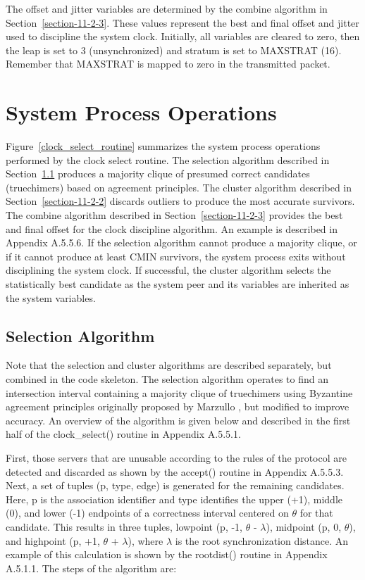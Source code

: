 The offset and jitter variables are determined by the combine
algorithm in Section~\ref{section-11-2-3}. These values represent the best and
final offset and jitter used to discipline the system clock.
Initially, all variables are cleared to zero, then the leap is set to
3 (unsynchronized) and stratum is set to MAXSTRAT (16). Remember
that MAXSTRAT is mapped to zero in the transmitted packet.

\section{System Process Operations}
\label{section-11-2}

Figure~\ref{clock_select_routine} summarizes the system process operations performed by the
clock select routine. The selection algorithm described in
Section~\ref{section-11-2-1} produces a majority clique of presumed correct
candidates (truechimers) based on agreement principles. The cluster
algorithm described in Section~\ref{section-11-2-2} discards outliers to produce
the most accurate survivors. The combine algorithm described in
Section~\ref{section-11-2-3} provides the best and final offset for the clock
discipline algorithm. An example is described in Appendix A.5.5.6.
If the selection algorithm cannot produce a majority clique, or if it
cannot produce at least CMIN survivors, the system process exits
without disciplining the system clock. If successful, the cluster
algorithm selects the statistically best candidate as the system peer
and its variables are inherited as the system variables.


\subsection{Selection Algorithm}
\label{section-11-2-1}

Note that the selection and cluster algorithms are described
separately, but combined in the code skeleton. The selection
algorithm operates to find an intersection interval containing a
majority clique of truechimers using Byzantine agreement principles
originally proposed by Marzullo \cite{ref6}, but modified to improve
accuracy. An overview of the algorithm is given below and described
in the first half of the clock\_select() routine in Appendix A.5.5.1.

First, those servers that are unusable according to the rules of the
protocol are detected and discarded as shown by the accept() routine
in Appendix A.5.5.3. Next, a set of tuples (p, type, edge) is
generated for the remaining candidates. Here, p is the association
identifier and type identifies the upper (+1), middle (0), and lower
(-1) endpoints of a correctness interval centered on $ \theta $ for that
candidate. This results in three tuples, lowpoint (p, -1, $ \theta $ -
$ \lambda $), midpoint (p, 0, $ \theta $), and highpoint (p, +1, $ \theta $ +
$ \lambda $), where $ \lambda $ is the root synchronization distance. An
example of this calculation is shown by the rootdist() routine in
Appendix A.5.1.1. The steps of the algorithm are:

